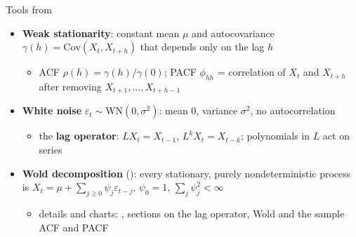 \begin{frame}{Tools from }
\itemsize{\small}
\begin{itemize}
    \item \textbf{Weak stationarity}: constant mean $\mu$ and autocovariance $\gamma(h) = \mathrm{Cov}(X_t, X_{t+h})$ that depends only on the lag $h$
    \begin{itemize}
        \item ACF $\rho(h) = \gamma(h)/\gamma(0)$; PACF $\phi_{hh}$ = correlation of $X_t$ and $X_{t+h}$ after removing $X_{t+1}, \dots, X_{t+h-1}$
    \end{itemize}
    \item \textbf{White noise} $\varepsilon_t \sim \mathrm{WN}(0, \sigma^2)$: mean 0, variance $\sigma^2$, no autocorrelation
    \begin{itemize}
        \item the \textbf{lag operator}: $LX_t = X_{t-1}$, $L^kX_t = X_{t-k}$; polynomials in $L$ act on series
    \end{itemize}
    \item \textbf{Wold decomposition} (): every stationary, purely nondeterministic process is $X_t = \mu + \sum_{j \ge 0}\psi_j\varepsilon_{t-j}$, $\psi_0 = 1$, $\sum_j\psi_j^2 < \infty$
    \begin{itemize}
        \item details and charts: , sections on the lag operator, Wold and the sample ACF and PACF
    \end{itemize}
\end{itemize}
\end{frame}

